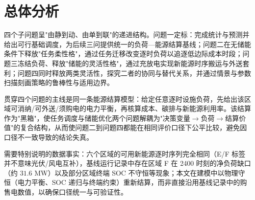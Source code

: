 \section{总体分析}

四个子问题呈"由静到动、由单到联"的递进结构。问题一定标：完成统计与预测并给出可行基础调度，为后续三问提供统一的负荷—能源结算基线；问题二在无储能条件下释放"任务柔性格"，通过任务迁移改变逐时负荷以追逐低边际成本时段；问题三冻结负荷、释放"储能的灵活性格"，通过充放电实现新能源时序搬运与外送套利；问题四同时释放两类灵活性，探究二者的协同与替代关系，并通过情景与参数扫描刻画策略的鲁棒性与适用边界。

贯穿四个问题的主线是同一条能源结算模型：给定任意逐时设施负荷，先给出该区域可消纳/可外送/须购电的电力平衡，再核算成本、碳排与新能源利用率。该结算作为"黑箱"，使任务调度与储能优化两个问题解耦为"决策变量$ \to $负荷$ \to $结算价值"的复合结构，从而使问题二到问题四都能在相同评价口径下公平比较，避免因口径不一致导致的结论失真。

需要特别说明的数据事实：六个区域的可用新能源逐时序列完全相同（E/F 标签并不意味光伏/风电互补），基线运行记录中存在区域 F 在 2400 时刻的净负荷缺口（约 $31.6$ MW）以及部分区域终端 SOC 不守恒等现象；本文在建模中以物理守恒（电力平衡、SOC 递归与终端约束）重新结算，而非直接沿用基线记录中的购售电数值，以确保口径统一与可验证性。
